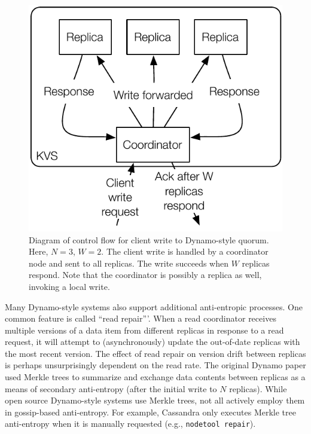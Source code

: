 \documentclass{vldb}
\begin{document}
\begin{figure}
\centering
\includegraphics[width=.8\columnwidth]{figs/dynamo-quorum.pdf}
\caption{Diagram of control flow for client write to Dynamo-style
  quorum.  Here, $N=3$, $W=2$. The client write is handled by a
  coordinator node and sent to all replicas. The write succeeds when
  $W$ replicas respond.  Note that the coordinator is possibly a
  replica as well, invoking a local write.}
\label{fig:dynamo-quorum}
\end{figure}

Many Dynamo-style systems also support additional anti-entropic
processes.  One common feature is called ``read repair'''.  When a
read coordinator receives multiple versions of a data item from
different replicas in response to a read request, it will attempt to
(asynchronously) update the out-of-date replicas with the most recent
version.  The effect of read repair on version drift between replicas
is perhaps unsurprisingly dependent on the read rate.  The original
Dynamo paper used Merkle trees to summarize and exchange data contents
between replicas as a means of secondary anti-entropy (after the
initial write to $N$ replicas).  While open source Dynamo-style
systems use Merkle trees, not all actively employ them in gossip-based
anti-entropy.  For example, Cassandra only executes Merkle tree
anti-entropy when it is manually requested (e.g., \texttt{nodetool
  repair}).

\end{document}
